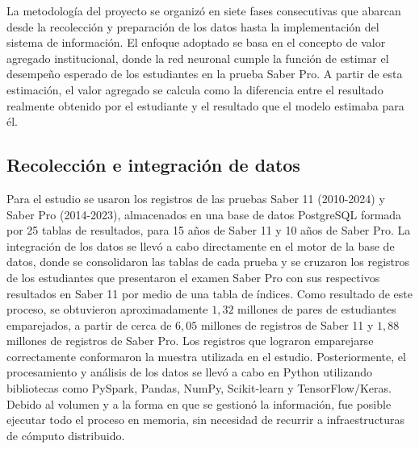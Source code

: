 
\renewcommand{\thetable}{\arabic{table}}
\renewcommand{\tablename}{Tabla}
\captionsetup[table]{
	format=plain,
	labelfont=bf,
	labelsep=colon
}


La metodología del proyecto se organizó en siete fases consecutivas que abarcan desde la recolección y preparación de los datos hasta la implementación del sistema de información. El enfoque adoptado se basa en el concepto de valor agregado institucional, donde la red neuronal cumple la función de estimar el desempeño esperado de los estudiantes en la prueba Saber Pro. A partir de esta estimación, el valor agregado se calcula como la diferencia entre el resultado realmente obtenido por el estudiante y el resultado que el modelo estimaba para él.

\subsection{Recolección e integración de datos}
Para el estudio se usaron los registros de las pruebas Saber 11 (2010-2024) y Saber Pro (2014-2023), almacenados en una base de datos PostgreSQL formada por 25 tablas de resultados, para 15 años de Saber 11 y 10 años de Saber Pro. La integración de los datos se llevó a cabo directamente en el motor de la base de datos, donde se consolidaron las tablas de cada prueba y se cruzaron los registros de los estudiantes que presentaron el examen Saber Pro con sus respectivos resultados en Saber 11 por medio de una tabla de índices. Como resultado de este proceso, se obtuvieron aproximadamente $1,32$ millones de pares de estudiantes emparejados, a partir de cerca de $6,05$ millones de registros de Saber 11 y $1,88$ millones de registros de Saber Pro. Los registros que lograron emparejarse correctamente conformaron la muestra utilizada en el estudio. Posteriormente, el procesamiento y análisis de los datos se llevó a cabo en Python utilizando bibliotecas como PySpark, Pandas, NumPy, Scikit-learn y TensorFlow/Keras. Debido al volumen y a la forma en que se gestionó la información, fue posible ejecutar todo el proceso en memoria, sin necesidad de recurrir a infraestructuras de cómputo distribuido.


